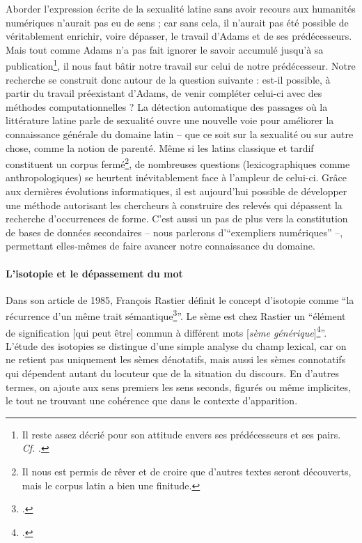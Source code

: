 Aborder l'expression écrite de la sexualité latine sans avoir recours aux humanités numériques n'aurait pas eu de sens ; car sans cela, il n'aurait pas été possible de véritablement enrichir, voire dépasser, le travail d'Adams et de ses prédécesseurs. Mais tout comme Adams n'a pas fait ignorer le savoir accumulé jusqu'à sa publication\footnote{Il reste assez décrié pour son attitude envers ses prédécesseurs et ses pairs. \textit{Cf.} \textcite{richlin_sexual_1978}.}, il nous faut bâtir notre travail sur celui de notre prédécesseur. Notre recherche se construit donc autour de la question suivante : est-il possible, à partir du travail préexistant d'Adams, de venir compléter celui-ci avec des méthodes computationnelles ? La détection automatique des passages où la littérature latine parle de sexualité ouvre une nouvelle voie pour améliorer la connaissance générale du domaine latin -- que ce soit sur la sexualité ou sur autre chose, comme la notion de parenté. Même si les latins classique et tardif constituent un corpus fermé\footnote{Il nous est permis de rêver et de croire que d'autres textes seront découverts, mais le corpus latin a bien une finitude.}, de nombreuses questions (lexicographiques comme anthropologiques) se heurtent inévitablement face à l'ampleur de celui-ci. Grâce aux dernières évolutions informatiques, il est aujourd'hui possible de développer une méthode autorisant les chercheurs à construire des relevés qui dépassent la recherche d'occurrences de forme. C'est aussi un pas de plus vers la constitution de bases de données secondaires -- nous parlerons d'\enquote{exempliers numériques} --, permettant elles-mêmes de faire avancer notre connaissance du domaine.


\paragraph{L'isotopie et le dépassement du mot}

Dans son article de 1985, François Rastier définit le concept d'isotopie comme \enquote{la récurrence d'un même trait sémantique\footcite{rastier_isotopie_1985}}. Le sème est chez Rastier un \enquote{élément de signification {[qui peut être]} commun à différent mots {[}\textit{sème générique}{]}\footcite{pincemin1999semantique}}. L'étude des isotopies se distingue d'une simple analyse du champ lexical, car on ne retient pas uniquement les sèmes dénotatifs, mais aussi les sèmes connotatifs qui dépendent autant du locuteur que de la situation du discours. En d'autres termes, on ajoute aux sens premiers les sens seconds, figurés ou même implicites, le tout ne trouvant une cohérence que dans le contexte d'apparition.


